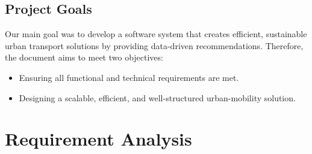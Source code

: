 \documentclass[a4paper,12pt]{article}
\begin{document}
\subsection*{Project Goals}
Our main goal was to develop a software system that creates efficient, sustainable urban transport solutions by providing data-driven recommendations. Therefore, the document aims to meet two objectives: 
\begin{itemize}
    \item Ensuring all functional and technical requirements are met.
    \item Designing a scalable, efficient, and well-structured urban-mobility solution.
\end{itemize}

\newpage

\section{Requirement Analysis}
\end{document}
